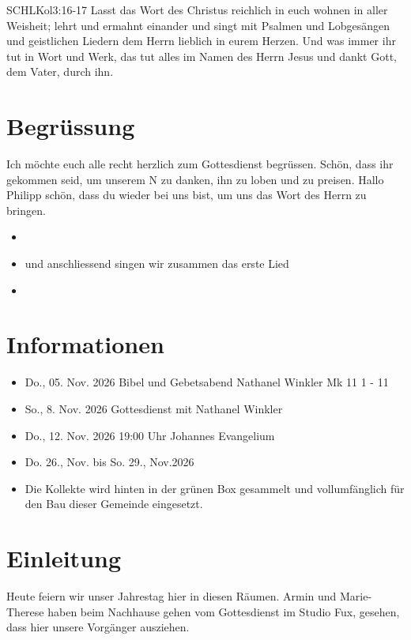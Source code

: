 \documentclass[fontsize=14pt]{mybib}
\author{OTS}
\newcommand{\Name}{Philipp}
\begin{document}
\begin{bibelbox}{SCHL}{Kol}{3:16-17}
    Lasst das Wort des Christus reichlich in euch wohnen in aller Weisheit; lehrt und ermahnt einander und singt mit Psalmen und Lobgesängen und geistlichen Liedern dem Herrn lieblich in eurem Herzen. Und was immer ihr tut in Wort und Werk, das tut alles im Namen des Herrn Jesus und dankt Gott, dem Vater, durch ihn.
\end{bibelbox}
\section{Begrüssung}
Ich möchte euch alle recht herzlich zum Gottesdienst begrüssen. Schön, dass ihr gekommen seid, um unserem \herr N zu danken, ihn zu loben und zu preisen. 
Hallo \Name{} schön, dass du wieder bei uns bist, um uns das Wort des Herrn zu bringen.

\begin{itemize}
    \item {}
    \item und anschliessend singen wir zusammen das erste Lied
    \item {}
\end{itemize}

\section{Informationen}
\begin{itemize}
    \item {} Do., 05. Nov. 2026 Bibel und Gebetsabend Nathanel Winkler Mk 11 1 - 11
    \item {} So., 8. Nov. 2026 Gottesdienst  mit Nathanel Winkler
    \item {} Do., 12. Nov. 2026 19:00 Uhr Johannes Evangelium
    \item {} Do. 26., Nov. bis So. 29., Nov.2026 
    \item {} Die Kollekte wird hinten in der grünen Box gesammelt und vollumfänglich für den Bau dieser Gemeinde eingesetzt.
\end{itemize}
\section{Einleitung}
Heute feiern wir unser Jahrestag hier in diesen Räumen. 
Armin und Marie-Therese haben beim Nachhause gehen vom Gottesdienst im Studio Fux, gesehen, dass hier unsere Vorgänger ausziehen.
\end{document}
